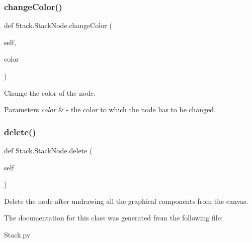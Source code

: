 \subsubsection{\texorpdfstring{change\+Color()}{changeColor()}}
{\footnotesize\ttfamily def Stack.\+Stack\+Node.\+change\+Color (\begin{DoxyParamCaption}\item[{}]{self,  }\item[{}]{color }\end{DoxyParamCaption})}



Change the color of the node. 


\begin{DoxyParams}{Parameters}
{\em color} & -\/ the color to which the node has to be changed. \\
\hline
\end{DoxyParams}
\mbox{\label{class_stack_1_1_stack_node_a96f87a002abf757eb12e5496f4c20eb4}} 
\subsubsection{\texorpdfstring{delete()}{delete()}}
{\footnotesize\ttfamily def Stack.\+Stack\+Node.\+delete (\begin{DoxyParamCaption}\item[{}]{self }\end{DoxyParamCaption})}



Delete the node after undrawing all the graphical components from the canvas. 



The documentation for this class was generated from the following file\+:\begin{DoxyCompactItemize}
\item 
Stack.\+py\end{DoxyCompactItemize}
